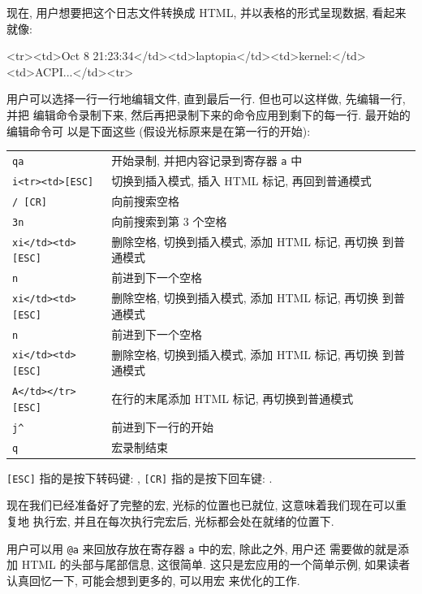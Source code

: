 现在, 用户想要把这个日志文件转换成 HTML, 并以表格的形式呈现数据, 看起来就像:
\begin{vimcode}
<tr><td>Oct 8 21:23:34</td><td>laptopia</td><td>kernel:</td><td>ACPI...</td><tr>
\end{vimcode}

用户可以选择一行一行地编辑文件, 直到最后一行. 但也可以这样做, 先编辑一行, 并把 
编辑命令录制下来, 然后再把录制下来的命令应用到剩下的每一行. 最开始的编辑命令可
以是下面这些 (假设光标原来是在第一行的开始):
\begin{center}
    \begin{tabular}{ll}
    \hline
    \texttt{qa}             & 开始录制, 并把内容记录到寄存器 \texttt{a} 中 \\
    \texttt{i<tr><td>[ESC]} & 切换到插入模式, 插入 HTML 标记, 再回到普通模式 \\
    \texttt{/ [CR]}         & 向前搜索空格 \\
    \texttt{3n}             & 向前搜索到第 3 个空格 \\
    \texttt{xi</td><td>[ESC]}& 删除空格, 切换到插入模式, 添加 HTML 标记, 再切换
        到普通模式 \\
    \texttt{n}              & 前进到下一个空格 \\
    \texttt{xi</td><td>[ESC]}& 删除空格, 切换到插入模式, 添加 HTML 标记, 再切换
        到普通模式 \\
    \texttt{n}              & 前进到下一个空格 \\
    \texttt{xi</td><td>[ESC]}& 删除空格, 切换到插入模式, 添加 HTML 标记, 再切换
        到普通模式 \\
    \texttt{A</td></tr>[ESC]}&在行的末尾添加 HTML 标记, 再切换到普通模式 \\
    \texttt{j\^}            & 前进到下一行的开始 \\
    \texttt{q}              & 宏录制结束 \\
    \hline
\end{tabular}
\end{center}

\begin{warning}
    \texttt{[ESC]} 指的是按下转码键: , \texttt{[CR]} 指的是按下回车键:
    .
\end{warning}

现在我们已经准备好了完整的宏, 光标的位置也已就位, 这意味着我们现在可以重复地
执行宏, 并且在每次执行完宏后, 光标都会处在就绪的位置下.

用户可以用 \texttt{@a} 来回放存放在寄存器 \texttt{a} 中的宏, 除此之外, 用户还 
需要做的就是添加 HTML 的头部与尾部信息, 这很简单.
这只是宏应用的一个简单示例, 如果读者认真回忆一下, 可能会想到更多的, 可以用宏
来优化的工作.

